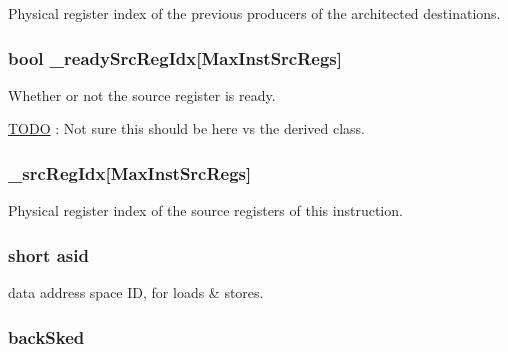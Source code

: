 \label{classInOrderDynInst_a11e21e74ba2438f42d888b1e80d6de27}
Physical register index of the previous producers of the architected destinations. \hypertarget{classInOrderDynInst_a125f1037e43155d592320e6c70a09b6b}{
\subsubsection[{\_\-readySrcRegIdx}]{\setlength{\rightskip}{0pt plus 5cm}bool {\bf \_\-readySrcRegIdx}\mbox{[}MaxInstSrcRegs\mbox{]}}}
\label{classInOrderDynInst_a125f1037e43155d592320e6c70a09b6b}
Whether or not the source register is ready. \begin{Desc}
\item[\hyperlink{todo__todo000017}{TODO}]: Not sure this should be here vs the derived class. \end{Desc}
\hypertarget{classInOrderDynInst_a4b535dc40624a3cf929b90739a59119c}{
\subsubsection[{\_\-srcRegIdx}]{ {\bf \_\-srcRegIdx}\mbox{[}MaxInstSrcRegs\mbox{]}}}
\label{classInOrderDynInst_a4b535dc40624a3cf929b90739a59119c}
Physical register index of the source registers of this instruction. \hypertarget{classInOrderDynInst_a03f3e3cd7500e78001075b53eab05a53}{
\subsubsection[{asid}]{\setlength{\rightskip}{0pt plus 5cm}short {\bf asid}}}
\label{classInOrderDynInst_a03f3e3cd7500e78001075b53eab05a53}
data address space ID, for loads \& stores. \hypertarget{classInOrderDynInst_a94ce1589c2fca1b4f1748d1ec3d672ed}{
\subsubsection[{backSked}]{ {\bf backSked}}}
